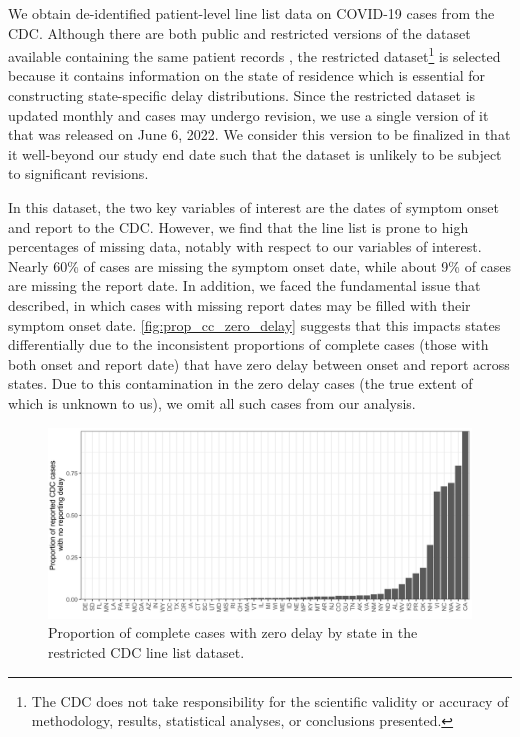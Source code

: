 \documentclass{article}
\begin{document}
We obtain de-identified patient-level line list data on COVID-19 cases from the
CDC. Although there are both public and restricted versions of the dataset
available containing the same patient records \citep{cdc2020casepub,
cdc2020caserestr}, the restricted dataset\footnote{The CDC does not take
responsibility for the scientific validity or accuracy of methodology, results,
statistical analyses, or conclusions presented.} is selected because it contains
information on the state of residence which is essential for constructing
state-specific delay distributions. Since the restricted dataset is updated
monthly and cases may undergo revision, we use a single version of it that was
released on June 6, 2022. We consider this version to be finalized in that it
well-beyond our study end date such that the dataset is unlikely to be subject
to significant revisions.

In this dataset, the two key variables of interest are the dates of symptom
onset and report to the CDC. However, we find that the line list is prone to
high percentages of missing data, notably with respect to our variables of
interest. Nearly 60\% of cases are missing the symptom onset date, while about
9\% of cases are missing the report date. In addition, we faced the
fundamental issue that \citet{jahja2022real} described, in which cases with
missing report dates may be filled with their symptom onset date.
\autoref{fig:prop_cc_zero_delay} suggests that this impacts states differentially
due to the inconsistent proportions of complete cases (those with
both onset and report date) that have zero delay between onset and report across
states. Due to this contamination in the zero delay cases (the true extent of
which is unknown to us), we omit all such cases from our analysis.

\begin{figure}[!tb]
\centering
    \includegraphics[width=.99\textwidth]{prop_cc_zero_delay.pdf}
    \caption{Proportion of complete cases with zero delay by state in the 
    restricted CDC line list dataset.}
    \label{fig:prop_cc_zero_delay}
\end{figure}
\end{document}
